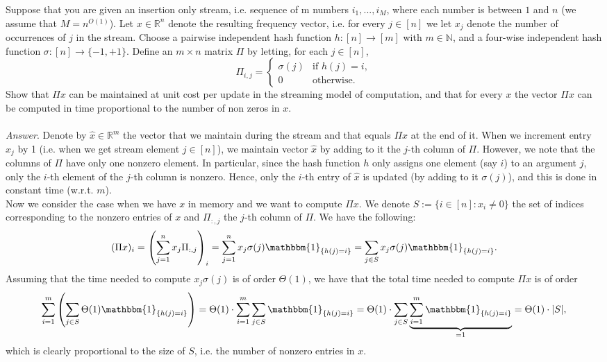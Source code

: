 \documentclass[10pt,usenames,dvipsnames]{article}
\newcommand{\N}{\mathbb{N}}
\newcommand{\R}{\mathbb{R}}
\newcommand{\ind}{\mathbbm{1}} %
\newenvironment{exercise}[2][Exercise]{\begin{trivlist}
  \item[\hskip \labelsep {\bfseries #1}\hskip \labelsep {\bfseries #2.}]}{\end{trivlist}}
\begin{document}
  \newpage
  \begin{exercise}{2a}
Suppose that you are given an insertion only stream, i.e. sequence of m numbers $i_1,...,i_M$, where each number is between $1$ and $n$ (we assume that $M = n^{O(1)}$). Let $x \in \R^n$ denote the resulting frequency vector, i.e. for every $j \in [n]$ we let $x_j$ denote the number of occurrences of $j$ in the stream. Choose a pairwise independent hash function $h : [n] \to [m]$ with $m \in \N$, and a four-wise independent hash function $\sigma : [n] \to \{-1,+1\}$. Define an $m\times n$ matrix $\Pi$ by letting, for each $j \in [n]$,
$$
\Pi_{i,j} = \left\{\begin{array}{rl} 
	\sigma(j) & \mbox{if } h(j) = i, \\
	0 & \mbox{otherwise}.
	\end{array}\right.
$$
 Show that $\Pi x$ can be maintained at unit cost per update in the streaming model of computation, and that for every $x$ the vector $\Pi x$ can be computed in time proportional to the number of non zeros in $x$.
\\ \\
\textit{Answer}. Denote by $\hat{x}\in \R^m$ the vector that we maintain during
the stream and that equals $\Pi x$ at the end of it. When we increment entry
$x_j$  by 1 (i.e. when we get stream element $j \in [n]$), we maintain
vector $\hat{x}$ by adding to it the $j$-th column of $\Pi$. However, we note that the
columns of $\Pi$ have only one nonzero element. In particular, since the hash
function $h$ only assigns one element (say $i$) to an argument $j$, only the
$i$-th element of the $j$-th column is nonzero. Hence, only the $i$-th entry of
$\hat{x}$ is updated (by adding to it $\sigma(j)$), and this is done in constant
time (w.r.t. $m$).
\\

Now we consider the case when we have $x$ in memory and we want to compute $\Pi x$. We denote $S:= \{i \in [n] : x_i \neq 0\}$ the set of indices corresponding to the nonzero entries of $x$ and $\Pi_{:,j} $ the $j$-th column of $\Pi$. We have the following:
\begin{equation}
\label{eq:Pix_i}
(\Pi x)_i  = \left( \sum_{j=1}^n x_j \Pi_{:,j} \right)_i  =  \sum_{j=1}^n  x_j \sigma(j) \ind_{\{ h(j) = i\}} = \sum_{j \in S}  x_j \sigma(j) \ind_{\{ h(j) = i\}}.
\end{equation}
Assuming that the time needed to compute $x_j \sigma(j)$ is of order $\Theta(1)$, we have that the total time needed to compute $\Pi x$ is of order
$$
	\sum_{i=1}^m \left( \sum_{j \in S}  \Theta(1) \ind_{\{ h(j) = i\}} \right) 
	= \Theta(1) \cdot \sum_{i=1}^m \sum_{j \in S} \ind_{\{ h(j) = i\}}  
	= \Theta(1) \cdot  \sum_{j \in S} \underbrace{\sum_{i=1}^m \ind_{\{ h(j) = i\}}}_{=1} 
	= \Theta(1) \cdot |S|,
$$
which is clearly proportional to the size of $S$, i.e. the number of nonzero entries in $x$.

  \end{exercise}
  
\end{document}
